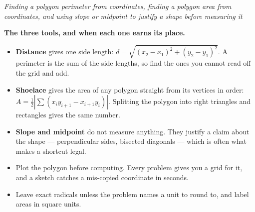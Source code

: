 \documentclass[12pt]{article}
\begin{document}

\begin{center}
\textit{Finding a polygon perimeter from coordinates, finding a polygon area
from coordinates, and using slope or midpoint to justify a shape before
measuring it}
\end{center}

\noindent\textbf{The three tools, and when each one earns its place.}
\begin{itemize}[leftmargin=1.2cm, itemsep=2pt, topsep=2pt]
\item \textbf{Distance} gives one side length:
$d = \sqrt{(x_2 - x_1)^2 + (y_2 - y_1)^2}$. A perimeter is the sum of the side
lengths, so find the ones you cannot read off the grid and add.
\item \textbf{Shoelace} gives the area of any polygon straight from its
vertices in order:
$A = \tfrac{1}{2}\left|\sum (x_i y_{i+1} - x_{i+1} y_i)\right|$. Splitting the
polygon into right triangles and rectangles gives the same number.
\item \textbf{Slope and midpoint} do not measure anything. They justify a
claim about the shape --- perpendicular sides, bisected diagonals --- which is
often what makes a shortcut legal.
\item Plot the polygon before computing. Every problem gives you a grid for it,
and a sketch catches a mis-copied coordinate in seconds.
\item Leave exact radicals unless the problem names a unit to round to, and
label areas in square units.
\end{itemize}

\vspace{0.2cm}

\end{document}
